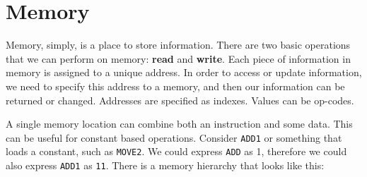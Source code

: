 \documentclass[11pt,a4paper,titlepage,dvipsnames,cmyk]{scrartcl}
\begin{document}
\section{Memory}%
\label{sec:Memory}

Memory, simply, is a place to store information. There are two basic
operations that we can perform on memory: \textbf{read} and
\textbf{write}. Each piece of information in memory is assigned to a
unique address. In order to access or update information, we need to
specify this address to a memory, and then our information can be returned
or changed. Addresses are specified as indexes. Values can be op-codes.

A single memory location can combine both an instruction and some data.
This can be useful for constant based operations. Consider
\lstinline|ADD1| or something that loads a constant, such as
\lstinline|MOVE2|. We could express \lstinline|ADD| as 1, therefore we
could also express \lstinline|ADD1| as \lstinline|11|. There is a memory
hierarchy that looks like this:
\end{document}
